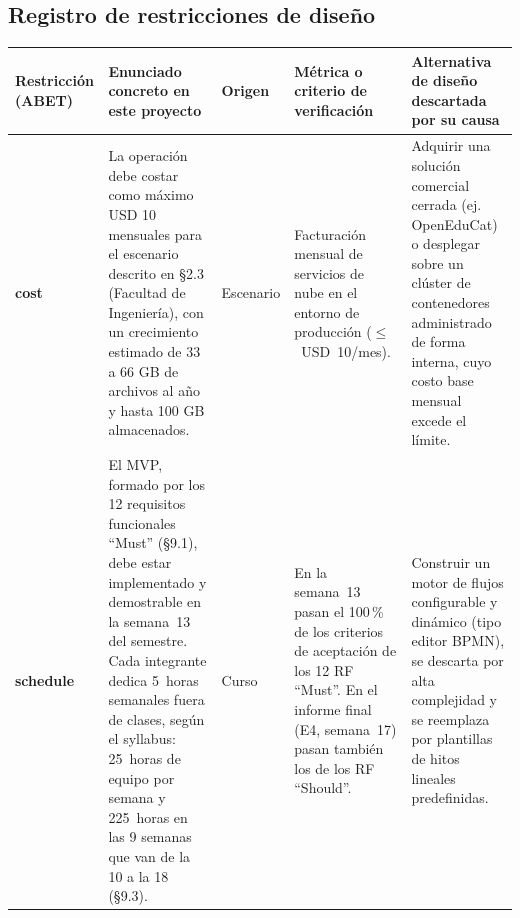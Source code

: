 \documentclass[10pt,a4paper]{article}
\newcommand{\hrow}{\rowcolor{encabezado}}
\newcommand{\h}[1]{\textbf{#1}}
\begin{document}
\subsection{Registro de restricciones de diseño}
\begin{xltabular}{\linewidth}{|P{2.4cm}|L|P{2.2cm}|P{3.0cm}|P{3.6cm}|}
\hline\hrow \h{Restricción (ABET)} & \h{Enunciado concreto en este proyecto} & \h{Origen} & \h{Métrica o criterio de verificación} & \h{Alternativa de diseño descartada por su causa} \\ \hline
\endhead
\textbf{cost} & La operación debe costar como máximo USD 10 mensuales para el escenario descrito en §2.3 (Facultad de Ingeniería), con un crecimiento estimado de 33 a 66 GB de archivos al año y hasta 100 GB almacenados. & Escenario & Facturación mensual de servicios de nube en el entorno de producción ($\le$~USD~10/mes). & Adquirir una solución comercial cerrada (ej. OpenEduCat) o desplegar sobre un clúster de contenedores administrado de forma interna, cuyo costo base mensual excede el límite. \\ \hline
\textbf{schedule} & El MVP, formado por los 12 requisitos funcionales ``Must'' (§9.1), debe estar implementado y demostrable en la semana~13 del semestre. Cada integrante dedica 5~horas semanales fuera de clases, según el syllabus: 25~horas de equipo por semana y 225~horas en las 9 semanas que van de la 10 a la 18 (§9.3). & Curso & En la semana~13 pasan el 100\,\% de los criterios de aceptación de los 12 RF ``Must''. En el informe final (E4, semana~17) pasan también los de los RF ``Should''. & Construir un motor de flujos configurable y dinámico (tipo editor BPMN), se descarta por alta complejidad y se reemplaza por plantillas de hitos lineales predefinidas. \\ \hline


\end{xltabular}
\end{document}
